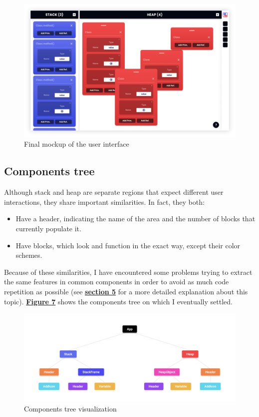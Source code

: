 \documentclass[]{usiinfbachelorproject}
\begin{document}
\vspace{\fill}

\pagebreak

\begin{figure}[h!]
\centering
\includegraphics[width=\textwidth]{figures/final_mockup.png}
\caption {Final mockup of the user interface}
\label{final ui}
\end{figure}

\subsection{Components tree}

Although stack and heap are separate regions that expect different user interactions, they share important similarities. In fact, they both:

\begin{itemize}
	\item Have a header, indicating the name of the area and the number of blocks that currently populate it.
	\item Have blocks, which look and function in the exact way, except their color schemes.
\end{itemize}

\noindent Because of these similarities, I have encountered some problems trying to extract the same features in common components in order to avoid as much code repetition as possible (see \hyperref[]{\textbf{section 5}} for a more detailed explanation about this topic). \hyperref[tree]{\textbf{Figure 7}} shows the components tree on which I eventually settled.

\begin{figure}[h!]
\centering
\includegraphics[width=\textwidth]{figures/tree.png}
\caption {Components tree visualization}
\label{tree}
\end{figure}
\end{document}
